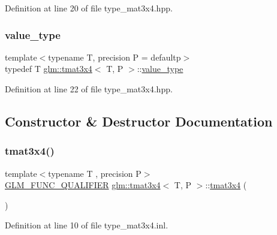 Definition at line 20 of file type\+\_\+mat3x4.\+hpp.

\mbox{\label{structglm_1_1tmat3x4_a027b8d0c3639472d209b40f4cbe2361e}} 
\subsubsection{\texorpdfstring{value\_type}{value\_type}}
{\footnotesize\ttfamily template$<$typename T, precision P = defaultp$>$ \\
typedef T \mbox{\hyperlink{structglm_1_1tmat3x4}{glm\+::tmat3x4}}$<$ T, P $>$\+::\mbox{\hyperlink{structglm_1_1tmat3x4_a027b8d0c3639472d209b40f4cbe2361e}{value\+\_\+type}}}



Definition at line 22 of file type\+\_\+mat3x4.\+hpp.



\subsection{Constructor \& Destructor Documentation}
\mbox{\label{structglm_1_1tmat3x4_a2bef718978c799d94cb376b64e9cdfd1}} 
\subsubsection{\texorpdfstring{tmat3x4()}{tmat3x4()}\hspace{0.1cm}{\footnotesize\ttfamily [1/22]}}
{\footnotesize\ttfamily template$<$typename T , precision P$>$ \\
\mbox{\hyperlink{setup_8hpp_a33fdea6f91c5f834105f7415e2a64407}{G\+L\+M\+\_\+\+F\+U\+N\+C\+\_\+\+Q\+U\+A\+L\+I\+F\+I\+ER}} \mbox{\hyperlink{structglm_1_1tmat3x4}{glm\+::tmat3x4}}$<$ T, P $>$\+::\mbox{\hyperlink{structglm_1_1tmat3x4}{tmat3x4}} (\begin{DoxyParamCaption}{ }\end{DoxyParamCaption})}



Definition at line 10 of file type\+\_\+mat3x4.\+inl.

\mbox{\label{structglm_1_1tmat3x4_ab424019515d481478f47bac3d055f621}} 
